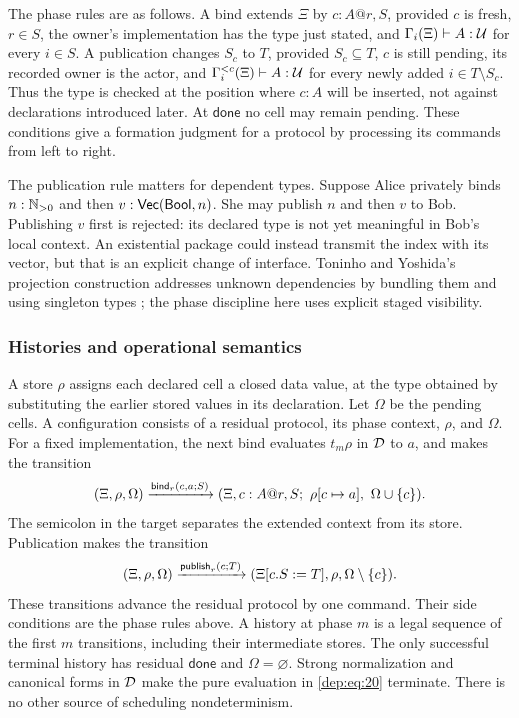 The phase rules are as follows.
A bind extends $\Xi$ by $c:A@r,S$, provided $c$ is fresh, $r\in S$,
the owner's implementation has the type just stated, and
$\Gamma_i(\Xi)\vdash A:\mathcal U$ for every $i\in S$.
A publication changes $S_c$ to $T$, provided $S_c\subseteq T$,
$c$ is still pending, its recorded owner is the actor, and
$\Gamma_i^{<c}(\Xi)\vdash A:\mathcal U$ for every newly added
$i\in T\setminus S_c$.
Thus the type is checked at the position where $c:A$ will be inserted,
not against declarations introduced later.
At $\mathsf{done}$ no cell may remain pending.
These conditions give a formation judgment for a protocol by processing
its commands from left to right.

The publication rule matters for dependent types. Suppose Alice privately
binds $n:\mathbb N_{>0}$ and then $v:\mathsf{Vec}(\mathsf{Bool},n)$. She may publish $n$
and then $v$ to Bob. Publishing $v$ first is rejected: its declared type is
not yet meaningful in Bob's local context. An existential package could
instead transmit the index with its vector, but that is an explicit change
of interface. Toninho and Yoshida's projection construction addresses
unknown dependencies by bundling them and using singleton types
\cite{ToninhoYoshida2017}; the phase discipline here uses explicit staged
visibility.

\subsubsection{Histories and operational semantics}

A store $\rho$ assigns each declared cell a closed data value, at the type
obtained by substituting the earlier stored values in its declaration.
Let $\Omega$ be the pending cells. A configuration consists of a residual
protocol, its phase context, $\rho$, and $\Omega$.
For a fixed implementation, the next bind evaluates $t_m\rho$ in $\mathcal D$
to $a$, and makes the transition
\begin{equation}
 (\Xi,\rho,\Omega)
 \xrightarrow{\mathsf{bind}_r(c,a;S)}
 (\Xi,c:A@r,S;\ \rho[c\mapsto a],\ \Omega\cup\{c\}).
 \label{dep:eq:20}
\end{equation}
The semicolon in the target separates the extended context from its store.
Publication makes the transition
\begin{equation}
 (\Xi,\rho,\Omega)
 \xrightarrow{\mathsf{publish}_r(c;T)}
 (\Xi[c.S:=T],\rho,\Omega\setminus\{c\}).
 \label{dep:eq:21}
\end{equation}
These transitions advance the residual protocol by one command. Their side
conditions are the phase rules above. A history at phase $m$ is a legal
sequence of the first $m$ transitions, including their intermediate stores.
The only successful terminal history has residual $\mathsf{done}$ and
$\Omega=\varnothing$.
Strong normalization and canonical forms in $\mathcal D$ make the pure evaluation
in \eqref{dep:eq:20} terminate. There is no other source of scheduling nondeterminism.

